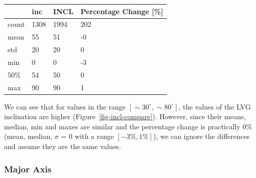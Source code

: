 \documentclass[
]{article}
\begin{document}
\begin{longtable}[]{@{}llll@{}}
\toprule\noalign{}
& inc & INCL & Percentage Change {[}\%{]} \\
\midrule\noalign{}
\endhead
\bottomrule\noalign{}
\endlastfoot
count & 1308 & 1994 & 202 \\
mean & 55 & 51 & -0 \\
std & 20 & 20 & 0 \\
min & 0 & 0 & -3 \\
50\% & 54 & 50 & 0 \\
max & 90 & 90 & 1 \\
\end{longtable}

We can see that for values in the range
\([\sim 30^\circ,\sim 80^\circ]\), the values of the LVG inclination are
higher (Figure~\ref{fig-incl-compare}). However, since their means,
median, min and maxes are similar and the percentage change is
practically 0\% (mean, median, \(\sigma\) = 0 with a range
\([-3\%,1\%]\)), we can ignore the differences and assume they are the
same values.

\subsubsection{Major Axis}
\end{document}
